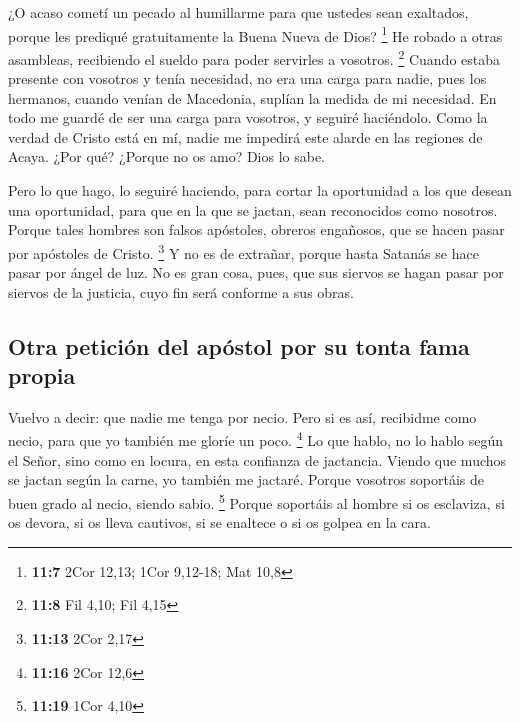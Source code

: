 \begin{paracol}{2}
 ¿O acaso cometí un pecado al humillarme para que ustedes
sean exaltados, porque les prediqué gratuitamente la Buena Nueva de
Dios? \footnote{\textbf{11:7} 2Cor 12,13; 1Cor 9,12-18; Mat 10,8}
 He robado a otras asambleas, recibiendo el sueldo para
poder servirles a vosotros. \footnote{\textbf{11:8} Fil 4,10; Fil 4,15}
 Cuando estaba presente con vosotros y tenía necesidad, no
era una carga para nadie, pues los hermanos, cuando venían de Macedonia,
suplían la medida de mi necesidad. En todo me guardé de ser una carga
para vosotros, y seguiré haciéndolo.  Como la verdad de
Cristo está en mí, nadie me impedirá este alarde en las regiones de
Acaya.  ¿Por qué? ¿Porque no os amo? Dios lo sabe.

 Pero lo que hago, lo seguiré haciendo, para cortar la
oportunidad a los que desean una oportunidad, para que en la que se
jactan, sean reconocidos como nosotros.  Porque tales
hombres son falsos apóstoles, obreros engañosos, que se hacen pasar por
apóstoles de Cristo. \footnote{\textbf{11:13} 2Cor 2,17} 
Y no es de extrañar, porque hasta Satanás se hace pasar por ángel de
luz.  No es gran cosa, pues, que sus siervos se hagan
pasar por siervos de la justicia, cuyo fin será conforme a sus obras.

\hypertarget{otra-peticiuxf3n-del-apuxf3stol-por-su-tonta-fama-propia}{%
\subsection{Otra petición del apóstol por su tonta fama
propia}\label{otra-peticiuxf3n-del-apuxf3stol-por-su-tonta-fama-propia}}

 Vuelvo a decir: que nadie me tenga por necio. Pero si es
así, recibidme como necio, para que yo también me gloríe un poco.
\footnote{\textbf{11:16} 2Cor 12,6}  Lo que hablo, no lo
hablo según el Señor, sino como en locura, en esta confianza de
jactancia.  Viendo que muchos se jactan según la carne,
yo también me jactaré.  Porque vosotros soportáis de buen
grado al necio, siendo sabio. \footnote{\textbf{11:19} 1Cor 4,10}
 Porque soportáis al hombre si os esclaviza, si os
devora, si os lleva cautivos, si se enaltece o si os golpea en la cara.

\hypertarget{el-apuxf3stol-se-jacta-de-su-ascendencia-de-su-oficio-de-la-plenitud-de-sus-sufrimientos-en-el-servicio-apostuxf3lico}{%
}
\end{paracol}
